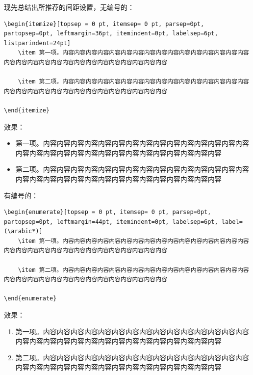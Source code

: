 现先总结出所推荐的间距设置，无编号的：
\begin{lstlisting}
\begin{itemize}[topsep = 0 pt, itemsep= 0 pt, parsep=0pt, partopsep=0pt, leftmargin=36pt, itemindent=0pt, labelsep=6pt, listparindent=24pt]
	\item 第一项。内容内容内容内容内容内容内容内容内容内容内容内容内容内容内容内容内容内容内容内容内容内容内容内容内容内容内容内容内容内容

	\item 第二项。内容内容内容内容内容内容内容内容内容内容内容内容内容内容内容内容内容内容内容内容内容内容内容内容内容内容内容内容内容内容
	
\end{itemize}
\end{lstlisting}
效果：
\begin{itemize}[topsep = 0 pt, itemsep= 0 pt, parsep=0pt, partopsep=0pt, leftmargin=36pt, itemindent=0pt, labelsep=6pt, listparindent=24pt]
	\item 第一项。内容内容内容内容内容内容内容内容内容内容内容内容内容内容内容内容内容内容内容内容内容内容内容内容内容内容内容内容内容内容

	\item 第二项。内容内容内容内容内容内容内容内容内容内容内容内容内容内容内容内容内容内容内容内容内容内容内容内容内容内容内容内容内容内容
	
\end{itemize}

有编号的：
\begin{lstlisting}
\begin{enumerate}[topsep = 0 pt, itemsep= 0 pt, parsep=0pt, partopsep=0pt, leftmargin=44pt, itemindent=0pt, labelsep=6pt, label=(\arabic*)]
	\item 第一项。内容内容内容内容内容内容内容内容内容内容内容内容内容内容内容内容内容内容内容内容内容内容内容内容内容内容内容内容内容内容

	\item 第二项。内容内容内容内容内容内容内容内容内容内容内容内容内容内容内容内容内容内容内容内容内容内容内容内容内容内容内容内容内容内容
	
\end{enumerate}
\end{lstlisting}
效果：
\begin{enumerate}[topsep = 0 pt, itemsep= 0 pt, parsep=0pt, partopsep=0pt, leftmargin=44pt, itemindent=0pt, labelsep=6pt, label=(\arabic*)]
	\item 第一项。内容内容内容内容内容内容内容内容内容内容内容内容内容内容内容内容内容内容内容内容内容内容内容内容内容内容内容内容内容内容

	\item 第二项。内容内容内容内容内容内容内容内容内容内容内容内容内容内容内容内容内容内容内容内容内容内容内容内容内容内容内容内容内容内容
	
\end{enumerate}

